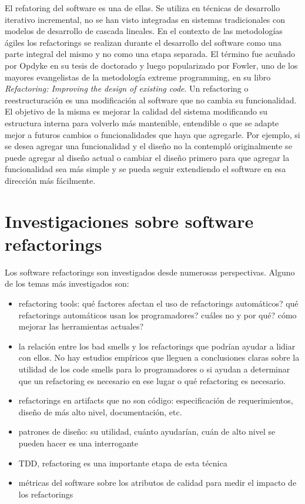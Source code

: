 El refatoring del software es una de ellas. Se utiliza en técnicas de desarrollo iterativo
incremental, no se han visto integradas en sistemas tradicionales con modelos de desarrollo de cascada lineales.
En el contexto de las metodologías ágiles los refactorings se realizan durante el desarrollo del
software como una parte integral del mismo y no como una etapa separada. El término fue acuñado por
Opdyke en su tesis de doctorado y luego popularizado por Fowler, uno de los mayores evangelistas de
la metodología extreme programming, en su libro \textit{Refactoring: Improving the design of existing code}.
Un refactoring o reestructuración es una modificación al software que no cambia su funcionalidad. El objetivo
de la misma es mejorar la calidad del sistema modificando su estructura interna para volverlo más mantenible,
entendible o que se adapte mejor a futuros cambios o funcionalidades que haya que agregarle. Por
ejemplo, si se desea agregar una funcionalidad y el diseño no la contempló originalmente se puede
agregar al diseño actual o cambiar el diseño primero para que agregar la funcionalidad sea más
simple y se pueda seguir extendiendo el software en esa dirección más fácilmente.








\section{Investigaciones sobre software refactorings}
Los software refactorings son investigados desde numerosas perspectivas. Alguno de los temas más
investigados son:
\begin{itemize}
    \item refactoring tools: qué factores afectan el uso de refactorings automáticos? qué
refactorings automáticos usan los programadores? cuáles no y por qué? cómo mejorar las herramientas actuales?
    \item la relación entre los bad smells y los refactorings que podrían ayudar a lidiar con ellos. No hay estudios
empíricos que lleguen a conclusiones claras sobre la utilidad de los code smells para lo
programadores o si ayudan a determinar que un refactoring es necesario en ese lugar o qué
refactoring es necesario.
    \item refactorings en artifacts que no son código: especificación de requerimientos, diseño de más alto nivel, documentación, etc.
    \item patrones de diseño: su utilidad, cuánto ayudarían, cuán de alto nivel se pueden hacer es una interrogante
    \item TDD, refactoring es una importante etapa de esta técnica 
    \item métricas del software sobre los atributos de calidad para medir el impacto de los
refactorings  
\end{itemize}


